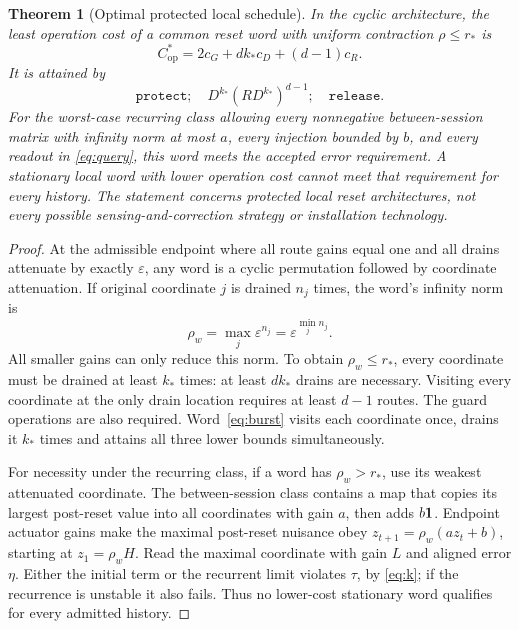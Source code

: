 \documentclass[11pt,letterpaper]{article}
\newtheorem{theorem}{Theorem}[section]
\theoremstyle{definition}\newtheorem{definition}[theorem]{Definition}
\theoremstyle{remark}\newtheorem{remark}[theorem]{Remark}
\begin{document}
\begin{theorem}[Optimal protected local schedule]
\label{thm:local}
In the cyclic architecture, the least operation cost of a common reset word with uniform contraction $\rho\leq r_*$ is
\begin{equation}
 C_{\mathrm{op}}^*=2c_G+d k_*c_D+(d-1)c_R.
 \label{eq:optimalcost}
\end{equation}
It is attained by
\begin{equation}
 \texttt{protect};\quad D^{k_*}(R D^{k_*})^{d-1};\quad\texttt{release}.
 \label{eq:burst}
\end{equation}
For the worst-case recurring class allowing every nonnegative between-session matrix with infinity norm at most $a$, every injection bounded by $b$, and every readout in \eqref{eq:query}, this word meets the accepted error requirement. A stationary local word with lower operation cost cannot meet that requirement for every history. The statement concerns protected local reset architectures, not every possible sensing-and-correction strategy or installation technology.
\end{theorem}
\begin{proof}
At the admissible endpoint where all route gains equal one and all drains attenuate by exactly $\varepsilon$, any word is a cyclic permutation followed by coordinate attenuation. If original coordinate $j$ is drained $n_j$ times, the word's infinity norm is
\begin{equation}
 \rho_w=\max_j\varepsilon^{n_j}=\varepsilon^{\min_j n_j}.
 \label{eq:counts}
\end{equation}
All smaller gains can only reduce this norm. To obtain $\rho_w\leq r_*$, every coordinate must be drained at least $k_*$ times: at least $dk_*$ drains are necessary. Visiting every coordinate at the only drain location requires at least $d-1$ routes. The guard operations are also required. Word~\eqref{eq:burst} visits each coordinate once, drains it $k_*$ times and attains all three lower bounds simultaneously.

For necessity under the recurring class, if a word has $\rho_w>r_*$, use its weakest attenuated coordinate. The between-session class contains a map that copies its largest post-reset value into all coordinates with gain $a$, then adds $b\mathbf1$. Endpoint actuator gains make the maximal post-reset nuisance obey $z_{t+1}=\rho_w(az_t+b)$, starting at $z_1=\rho_w H$. Read the maximal coordinate with gain $L$ and aligned error $\eta$. Either the initial term or the recurrent limit violates $\tau$, by \eqref{eq:k}; if the recurrence is unstable it also fails. Thus no lower-cost stationary word qualifies for every admitted history.
\end{proof}
\end{document}
